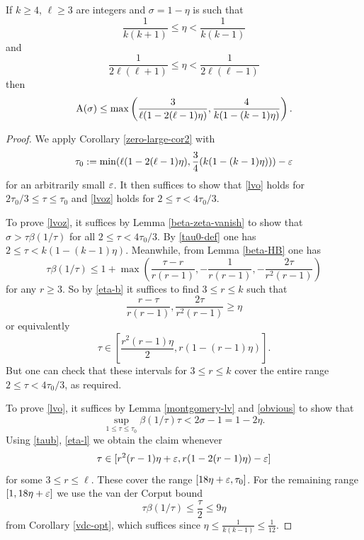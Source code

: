 \begin{theorem}\label{pintz-density}\cite[Theorem 1]{pintz_density_2023}  If $k \geq 4$, $\ell \geq 3$ are integers and $\sigma = 1-\eta$ is such that
\begin{equation}\label{eta-b}
    \frac{1}{k(k+1)} \leq \eta < \frac{1}{k(k-1)}
\end{equation}
and
\begin{equation}\label{eta-l}
 \frac{1}{2\ell(\ell+1)} \leq \eta < \frac{1}{2\ell(\ell-1)}
\end{equation}
then
$$ \mathrm{A}(\sigma) \leq \max\left( \frac{3}{\ell(1-2(\ell-1)\eta)}, \frac{4}{k(1-(k-1)\eta)}\right).$$
\end{theorem}
\literature
{}

\begin{proof} We apply Corollary \ref{zero-large-cor2} with
\begin{equation}\label{tau0-def}
\tau_0 := \min( \ell (1 - 2(\ell-1) \eta), \frac{3}{4} (k(1-(k-1)\eta)) ) - \varepsilon
\end{equation}
for an arbitrarily small $\varepsilon$.
It then suffices to show that \eqref{lvo} holds for $2\tau_0/3 \leq \tau \leq \tau_0$ and \eqref{lvoz} holds for $2 \leq \tau < 4\tau_0/3$.

To prove \eqref{lvoz}, it suffices by Lemma \ref{beta-zeta-vanish} to show that $\sigma > \tau \beta(1/\tau)$ for all $2 \leq \tau < 4 \tau_0/3$.  By \eqref{tau0-def} one has $2 \leq \tau < k(1-(k-1)\eta)$.  Meanwhile, from Lemma \ref{beta-HB} one has
\begin{equation}\label{taub}
\tau \beta(1/\tau) \leq 1 + \max\left( \frac{\tau-r}{r(r-1)}, -\frac{1}{r(r-1)}, - \frac{2\tau}{r^2(r-1)}\right)
\end{equation}
for any $r \geq 3$.  So by \eqref{eta-b} it suffices to find $3 \leq r \leq k$ such that
$$ \frac{r-\tau}{r(r-1)}, \frac{2\tau}{r^2(r-1)} \geq \eta$$
or equivalently
$$ \tau \in [\frac{r^2(r-1)\eta}{2}, r(1-(r-1)\eta)].$$
But one can check that these intervals for $3 \leq r \leq k$ cover the entire range $2 \leq \tau < 4\tau_0/3$, as required.

To prove \eqref{lvo}, it suffices by Lemma \ref{montgomery-lv} and \eqref{obvious} to show that
$$ \sup_{1 \leq \tau \leq \tau_0} \beta(1/\tau) \tau < 2\sigma - 1 = 1 - 2 \eta.$$
Using \eqref{taub}, \eqref{eta-l} we obtain the claim whenever
$$ \tau \in [r^2(r-1)\eta+\varepsilon, r(1-2(r-1)\eta)-\varepsilon]$$
for some $3 \leq r \leq \ell$.  These cover the range $[18\eta+\varepsilon, \tau_0]$.  For the remaining range $[1, 18\eta+\varepsilon]$ we use the van der Corput bound
$$ \tau \beta(1/\tau) \leq \frac{\tau}{2} \leq 9 \eta$$
from Corollary \ref{vdc-opt}, which suffices since $\eta \leq \frac{1}{k(k-1)} \leq \frac{1}{12}$.
\end{proof}

